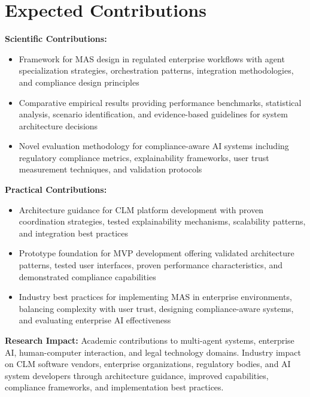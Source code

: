 
\chapter{Expected Contributions}\label{chapter:expected_contributions}

\textbf{Scientific Contributions:}
\begin{itemize}
    \item Framework for MAS design in regulated enterprise workflows with agent specialization strategies, orchestration patterns, integration methodologies, and compliance design principles
    \item Comparative empirical results providing performance benchmarks, statistical analysis, scenario identification, and evidence-based guidelines for system architecture decisions
    \item Novel evaluation methodology for compliance-aware AI systems including regulatory compliance metrics, explainability frameworks, user trust measurement techniques, and validation protocols
\end{itemize}

\textbf{Practical Contributions:}
\begin{itemize}
    \item Architecture guidance for CLM platform development with proven coordination strategies, tested explainability mechanisms, scalability patterns, and integration best practices
    \item Prototype foundation for MVP development offering validated architecture patterns, tested user interfaces, proven performance characteristics, and demonstrated compliance capabilities
    \item Industry best practices for implementing MAS in enterprise environments, balancing complexity with user trust, designing compliance-aware systems, and evaluating enterprise AI effectiveness
\end{itemize}

\textbf{Research Impact:} Academic contributions to multi-agent systems, enterprise AI, human-computer interaction, and legal technology domains. Industry impact on CLM software vendors, enterprise organizations, regulatory bodies, and AI system developers through architecture guidance, improved capabilities, compliance frameworks, and implementation best practices.
